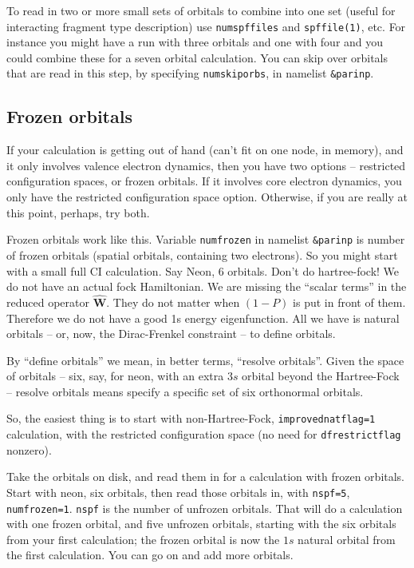 \documentclass[10pt,leqno, oneside]{book}
\begin{document}
To read in two or more small sets of orbitals to combine into one set (useful for
interacting fragment type description) use \verb#numspffiles# and \verb#spffile(1)#, etc.  For instance you might have a run with three orbitals and one with
four and you could combine these for a seven orbital calculation.  You can skip over orbitals that are read in this step, by specifying \verb#numskiporbs#,
in namelist \verb#&parinp#.

\subsection{Frozen orbitals \label{frosect}}

If your calculation is getting out of hand (can't fit on one node, in memory), 
and it only involves valence electron dynamics, then you have two options -- restricted configuration spaces, or frozen orbitals.
If it involves core electron dynamics, you only have the restricted configuration space option.
Otherwise, if you are really at this point, perhaps, try both.

Frozen orbitals work like this.  Variable \verb#numfrozen# in namelist \verb#&parinp# is number of frozen orbitals (spatial orbitals, containing
two electrons).  So you might start with a small full CI calculation.  Say Neon, 6 orbitals.  Don't do hartree-fock!  We do not have an actual fock Hamiltonian.
We are missing the ``scalar terms'' in the reduced operator $\mathbf{\hat{W}}$.  They do not matter when $(1-P)$ is put in front of them.  
Therefore we do not have a good 1s energy eigenfunction.  All we have is natural orbitals 
-- or, now, the Dirac-Frenkel constraint -- to define orbitals.

By ``define orbitals'' we mean, in better terms, ``resolve orbitals''.  Given the space of orbitals -- six, say, for neon, with an extra $3s$ orbital beyond
the Hartree-Fock -- resolve orbitals means specify a specific set of six orthonormal orbitals.

So, the easiest thing is to start with non-Hartree-Fock, \verb#improvednatflag=1# calculation, with the restricted configuration space (no need for
\verb#dfrestrictflag# nonzero).

Take the orbitals on disk, and read them in for a calculation with frozen orbitals.  Start with neon, six orbitals, then read those orbitals in,
with \verb#nspf=5#, \verb#numfrozen=1#.  \verb#nspf# is the number
of unfrozen orbitals.
That will do a calculation with one frozen orbital, and five unfrozen orbitals, starting with the six
orbitals from your first calculation; the frozen orbital is now the $1s$ natural orbital from the first calculation.  You can go on and add more orbitals.
\end{document}
